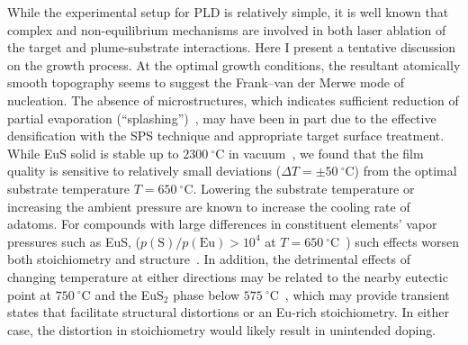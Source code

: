 While the experimental setup for PLD is relatively simple, it is well known that complex and non-equilibrium mechanisms are involved in both laser ablation of the target and plume-substrate interactions. Here I present a tentative discussion on the growth process. At the optimal growth conditions, the resultant atomically smooth topography seems to suggest the Frank--van der Merwe mode of nucleation. The absence of microstructures, which indicates sufficient reduction of partial evaporation (``splashing'')~\cite{PLD_book}, may have been in part due to the effective densification with the SPS technique and appropriate target surface treatment. While EuS solid is stable up to $2300~^{\circ}\mathrm{C}$ in vacuum~\cite{EuS_phase_diagram}, we found that the film quality is sensitive to relatively small deviations ($\Delta{}T=\pm50~^{\circ}\mathrm{C}$) from the optimal substrate temperature $T=650~^{\circ}\mathrm{C}$. Lowering the substrate temperature or increasing the ambient pressure are known to increase the cooling rate of adatoms. For compounds with large differences in constituent elements' vapor pressures such as EuS, ($p(\mathrm{S})/p(\mathrm{Eu})>10^4$ at $T=650~^{\circ}\mathrm{C}$~\cite{elements}) such effects worsen both stoichiometry and structure~\cite{Metev1988}. In addition, the detrimental effects of changing temperature at either directions may be related to the nearby eutectic point at $750~^{\circ}\mathrm{C}$ and the EuS$_2$ phase below $575~^{\circ}\mathrm{C}$~\cite{EuS_phase_diagram}, which may provide transient states that facilitate structural distortions or an Eu-rich stoichiometry. In either case, the distortion in stoichiometry would likely result in unintended doping.

